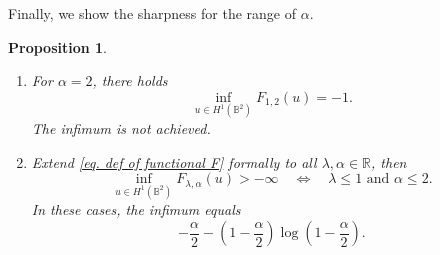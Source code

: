 \documentclass[11pt,a4paper,twoside]{amsart}
\newtheorem{proposition}[theorem]{Proposition}
\newtheorem{sketch proof}{Sketch of the proof}[section]
\begin{document}
    Finally, we show the sharpness for the range of $\alpha$.
\begin{proposition}
\label{prop. sharpness of alpha}
\
    \begin{enumerate}
        \item For $\alpha=2$, there holds
        \[
        \inf_{u\in H^1(\mathbb{B}^2)}F_{1,2}(u)
        = -1.
        \]
        The infimum is not achieved.
        \item Extend \cref{eq. def of functional F} formally to all
        $\lambda,\alpha\in\mathbb{R}$, then
        \[
        \inf_{u\in H^1(\mathbb{B}^2)}
        F_{\lambda,\alpha}(u)>-\infty\quad
        \Longleftrightarrow\quad 
        \lambda\leq 1 \text{ and } 
        \alpha\leq 2.
        \]
        In these cases, the infimum equals
        \[
        -\frac{\alpha}{2}
        -\left(1-\frac{\alpha}{2}\right)
        \log\left(1-\frac{\alpha}{2}\right).
        \]
    \end{enumerate}
    \end{proposition}
\end{document}
